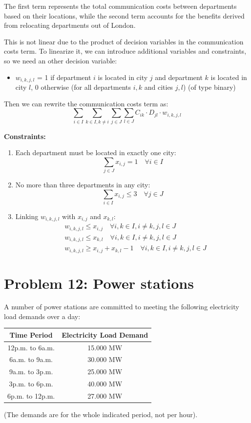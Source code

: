 \documentclass[a4paper,10pt]{article}
\begin{document}
The first term represents the total communication costs between departments based on their locations, while the second term accounts for the benefits derived from relocating departments out of London.

This is not linear due to the product of decision variables in the communication costs term. To linearize it, we can introduce additional variables and constraints, so we need an other decision variable:
\begin{itemize}
  \item \(w_{i,k,j,l}\) = 1 if department \(i\) is located in city \(j\) and department \(k\) is located in city \(l\), 0 otherwise (for all departments \(i, k\) and cities \(j, l\)) (of type binary)
\end{itemize}

Then we can rewrite the communication costs term as:
\[
  \sum_{i \in I} \sum_{k \in I, k \neq i} \sum_{j \in J} \sum_{l \in J} C_{ik} \cdot D_{jl} \cdot w_{i,k,j,l}
\]


\textbf{Constraints:}
\begin{enumerate}
  \item Each department must be located in exactly one city:
  \[\boxed{\sum_{j \in J} x_{i,j} = 1 \quad \forall i \in I}\]
  \item No more than three departments in any city:
  \[\boxed{\sum_{i \in I} x_{i,j} \leq 3 \quad \forall j \in J}\]
  \item Linking \(w_{i,k,j,l}\) with \(x_{i,j}\) and \(x_{k,l}\):
  \begin{align*}
    &w_{i,k,j,l} \leq x_{i,j} \quad \forall i, k \in I, i \neq k, j, l \in J\\
    &w_{i,k,j,l} \leq x_{k,l} \quad \forall i, k \in I, i \neq k, j, l \in J\\
    &w_{i,k,j,l} \geq x_{i,j} + x_{k,l} - 1 \quad \forall i, k \in I, i \neq k, j, l \in J  
  \end{align*}

\end{enumerate}


\newpage
\section*{Problem 12: Power stations}

A number of power stations are committed to meeting the following electricity load demands
over a day:

\begin{table}[H]
\centering
\begin{tabular}{|c|c|}
\hline
Time Period & Electricity Load Demand \\
\hline
12p.m. to 6a.m. & 15.000 MW \\
6a.m. to 9a.m. & 30.000 MW \\
9a.m. to 3p.m. & 25.000 MW \\
3p.m. to 6p.m. & 40.000 MW \\
6p.m. to 12p.m. & 27.000 MW \\
\hline
\end{tabular}
\end{table}
(The demands are for the whole indicated period, not per hour).
\end{document}

